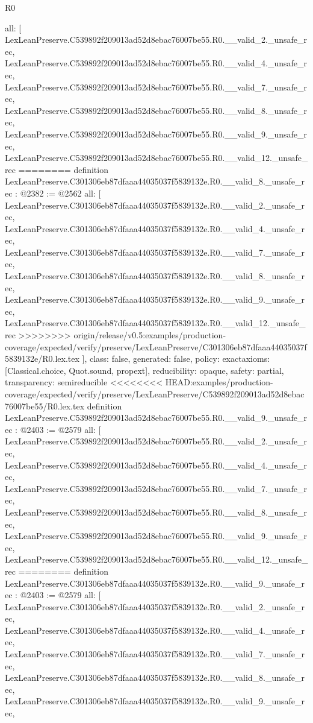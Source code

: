 \begin{lexlean}{R0}
\begin{coremodule}
{{{{{{{{{{{{{{{{{{{{{{{{{{{{{{{{{{{{{{{{{{{{{{{{{{{{{  all: [
    LexLeanPreserve.C539892f209013ad52d8ebac76007be55.R0.__valid_2._unsafe_rec,
    LexLeanPreserve.C539892f209013ad52d8ebac76007be55.R0.__valid_4._unsafe_rec,
    LexLeanPreserve.C539892f209013ad52d8ebac76007be55.R0.__valid_7._unsafe_rec,
    LexLeanPreserve.C539892f209013ad52d8ebac76007be55.R0.__valid_8._unsafe_rec,
    LexLeanPreserve.C539892f209013ad52d8ebac76007be55.R0.__valid_9._unsafe_rec,
    LexLeanPreserve.C539892f209013ad52d8ebac76007be55.R0.__valid_12._unsafe_rec
========
definition LexLeanPreserve.C301306eb87dfaaa44035037f5839132e.R0.__valid_8._unsafe_rec : @2382 := @2562 {
  all: [
    LexLeanPreserve.C301306eb87dfaaa44035037f5839132e.R0.__valid_2._unsafe_rec,
    LexLeanPreserve.C301306eb87dfaaa44035037f5839132e.R0.__valid_4._unsafe_rec,
    LexLeanPreserve.C301306eb87dfaaa44035037f5839132e.R0.__valid_7._unsafe_rec,
    LexLeanPreserve.C301306eb87dfaaa44035037f5839132e.R0.__valid_8._unsafe_rec,
    LexLeanPreserve.C301306eb87dfaaa44035037f5839132e.R0.__valid_9._unsafe_rec,
    LexLeanPreserve.C301306eb87dfaaa44035037f5839132e.R0.__valid_12._unsafe_rec
>>>>>>>> origin/release/v0.5:examples/production-coverage/expected/verify/preserve/LexLeanPreserve/C301306eb87dfaaa44035037f5839132e/R0.lex.tex
  ],
  class: false,
  generated: false,
  policy: exact{axioms: [Classical.choice, Quot.sound, propext]},
  reducibility: opaque{},
  safety: partial,
  transparency: semireducible
}
<<<<<<<< HEAD:examples/production-coverage/expected/verify/preserve/LexLeanPreserve/C539892f209013ad52d8ebac76007be55/R0.lex.tex
definition LexLeanPreserve.C539892f209013ad52d8ebac76007be55.R0.__valid_9._unsafe_rec : @2403 := @2579 {
  all: [
    LexLeanPreserve.C539892f209013ad52d8ebac76007be55.R0.__valid_2._unsafe_rec,
    LexLeanPreserve.C539892f209013ad52d8ebac76007be55.R0.__valid_4._unsafe_rec,
    LexLeanPreserve.C539892f209013ad52d8ebac76007be55.R0.__valid_7._unsafe_rec,
    LexLeanPreserve.C539892f209013ad52d8ebac76007be55.R0.__valid_8._unsafe_rec,
    LexLeanPreserve.C539892f209013ad52d8ebac76007be55.R0.__valid_9._unsafe_rec,
    LexLeanPreserve.C539892f209013ad52d8ebac76007be55.R0.__valid_12._unsafe_rec
========
definition LexLeanPreserve.C301306eb87dfaaa44035037f5839132e.R0.__valid_9._unsafe_rec : @2403 := @2579 {
  all: [
    LexLeanPreserve.C301306eb87dfaaa44035037f5839132e.R0.__valid_2._unsafe_rec,
    LexLeanPreserve.C301306eb87dfaaa44035037f5839132e.R0.__valid_4._unsafe_rec,
    LexLeanPreserve.C301306eb87dfaaa44035037f5839132e.R0.__valid_7._unsafe_rec,
    LexLeanPreserve.C301306eb87dfaaa44035037f5839132e.R0.__valid_8._unsafe_rec,
    LexLeanPreserve.C301306eb87dfaaa44035037f5839132e.R0.__valid_9._unsafe_rec,
}}}}}}}}}}}}}}}}}}}}}}}}}}}}}}}}}}}}}}}}}}}}}}}}}}}}}}}
\end{coremodule}
\end{lexlean}
